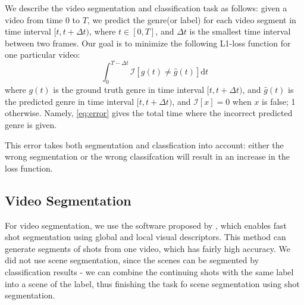 \documentclass{article}
\begin{document}
We describe the video segmentation and classification task as follows: given a video from time $0$ to $T$, we predict the genre(or label) for each video segment in time interval $[t, t + \Delta t)$, where $t \in [0, T]$, and $\Delta t$ is the smallest time interval between two frames. Our goal is to minimize the following L1-loss function for one particular video:
\begin{equation}
    \int_{0}^{T - \Delta t} \mathcal{I}[g(t) \neq \hat{g}(t)] \mathrm{d} t
    \label{eq:error}
\end{equation}
where $g(t)$ is the ground truth genre in time interval $[t, t + \Delta t)$, and $\hat{g}(t)$ is the predicted genre in time interval $[t, t + \Delta t)$, and $\mathcal{I}[x] = 0$ when $x$ is false; 1 otherwise. Namely, \ref{eq:error} gives the total time where the incorrect predicted genre is given.\par
This error takes both segmentation and classfication into account: either the wrong segmentation or the wrong classifcation will result in an increase in the loss function.

\subsection{Video Segmentation}
For video segmentation, we use the software proposed by \cite{apostolidisfast}, which enables fast shot segmentation using global and local visual descriptors. This method can generate segments of shots from one video, which has fairly high accuracy. We did not use scene segmentation, since the scenes can be segmented by classification results - we can combine the continuing shots with the same label into a scene of the label, thus finishing the task fo scene segmentation using shot segmentation.
\end{document}
